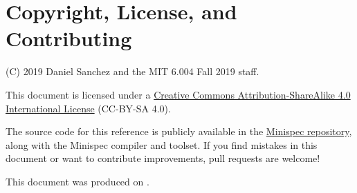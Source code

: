 \section{Copyright, License, and Contributing}

(C) 2019 Daniel Sanchez and the MIT 6.004 Fall 2019 staff.

This document is licensed under a \href{http://creativecommons.org/licenses/by-sa/4.0/}{Creative Commons Attribution-ShareAlike 4.0 International License} (CC-BY-SA 4.0).

The source code for this reference is publicly available in the \href{https://github.mit.edu/6004/minispec/}{Minispec repository},
along with the Minispec compiler and toolset.
If you find mistakes in this document or want to contribute improvements, pull requests are welcome!

This document was produced on .
